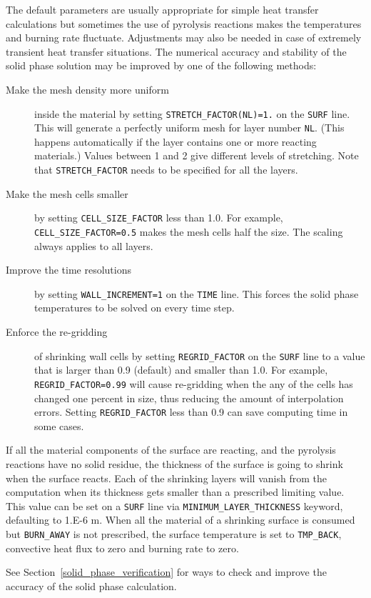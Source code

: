 \documentclass[11pt]{book}
\newcommand{\ct}{\tt\small}
\begin{document}
The default parameters are usually appropriate for simple heat transfer calculations but sometimes the use of pyrolysis reactions
makes the temperatures and burning rate fluctuate. Adjustments may also be needed in case of
extremely transient heat transfer situations. The numerical accuracy and stability of the solid phase solution may be improved by
one of the following methods:
\begin{description}
\item[Make the mesh density more uniform ] inside the material by setting {\ct STRETCH\_FACTOR(NL)=1.}
on the {\ct SURF} line. This will generate a perfectly uniform mesh for layer number {\ct NL}. (This happens automatically if the layer
contains one or more reacting materials.) Values between 1 and 2 give different levels of stretching.
Note that {\ct STRETCH\_FACTOR} needs to be specified for all the layers.
\item[Make the mesh cells smaller] by setting {\ct CELL\_SIZE\_FACTOR} less than 1.0. For example, {\ct CELL\_SIZE\_FACTOR=0.5} makes the
mesh cells half the size. The scaling always applies to all layers.
\item[Improve the time resolutions] by setting {\ct WALL\_INCREMENT=1} on the
{\ct TIME} line. This forces the solid phase temperatures to be solved on every time step.
\item[Enforce the re-gridding] of shrinking wall cells by setting {\ct REGRID\_FACTOR} on the {\ct SURF} line to a value that is larger than 0.9 (default)
and smaller than 1.0. For example, {\ct REGRID\_FACTOR=0.99} will cause re-gridding when the any of the cells has changed one percent in size, thus
reducing the amount of interpolation errors. Setting {\ct REGRID\_FACTOR} less than 0.9 can save computing time in some cases.
\end{description}

If all the material components of the surface are reacting, and the pyrolysis reactions have no solid residue, the thickness of
the surface is going to shrink when the surface reacts. Each of the shrinking layers will vanish from the computation when its thickness gets
smaller than a prescribed limiting value. This value can be set on a {\ct SURF} line via {\ct MINIMUM\_LAYER\_THICKNESS} keyword,
defaulting to 1.E-6 m. When all the material of a shrinking surface is consumed but {\ct BURN\_AWAY} is not
prescribed, the surface temperature is set to {\ct TMP\_BACK}, convective heat flux to zero and burning rate to zero.

See Section~\ref{solid_phase_verification} for ways to check and improve the accuracy of the solid phase calculation.
\end{document}
